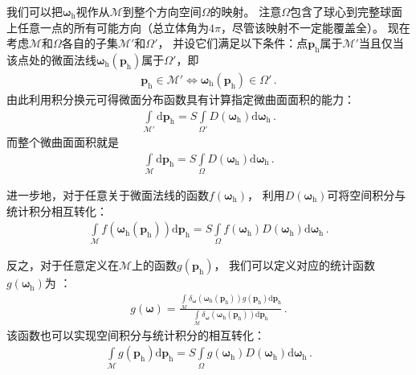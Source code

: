 我们可以把${\bm\omega}_{\mathrm{h}}$视作从$\mathcal{M}$到整个方向空间$\varOmega$的映射。
注意$\varOmega$包含了球心到完整球面上任意一点的所有可能方向（总立体角为$4\pi$，尽管该映射不一定能覆盖全）。
现在考虑$\mathcal{M}$和$\varOmega$各自的子集$\mathcal{M'}$和$\varOmega'$，
并设它们满足以下条件：点${\bm p}_{\mathrm{h}}$属于$\mathcal{M'}$当且仅当
该点处的微面法线${\bm\omega}_{\mathrm{h}}({\bm p}_{\mathrm{h}})$属于$\varOmega'$，即
\begin{align}
    {\bm p}_{\mathrm{h}}\in\mathcal{M'}\Leftrightarrow
    {\bm\omega}_{\mathrm{h}}({\bm p}_{\mathrm{h}})\in\varOmega'\, .
\end{align}
由此利用积分换元可得微面分布函数具有计算指定微曲面面积的能力：
\begin{align}
    \label{eq:08ex01-microsurfaceArea}
    \int\limits_{\mathcal{M}'}\mathrm{d}{\bm p}_{\mathrm{h}}
    =S\int\limits_{\varOmega'}D({\bm\omega}_{\mathrm{h}})\mathrm{d}{\bm\omega}_{\mathrm{h}}\, .
\end{align}
而整个微曲面面积就是
\begin{align}
    \int\limits_{\mathcal{M}}\mathrm{d}{\bm p}_{\mathrm{h}}
    =S\int\limits_{\varOmega}D({\bm\omega}_{\mathrm{h}})\mathrm{d}{\bm\omega}_{\mathrm{h}}\, .
\end{align}

进一步地，对于任意关于微面法线的函数$f({\bm\omega}_{\mathrm{h}})$，
利用$D({\bm\omega}_{\mathrm{h}})$可将空间积分与统计积分相互转化：
\begin{align}
    \int\limits_{\mathcal{M}}f({\bm\omega}_{\mathrm{h}}({\bm p}_{\mathrm{h}}))\mathrm{d}{\bm p}_{\mathrm{h}}
    =S\int\limits_{\varOmega}f({\bm\omega}_{\mathrm{h}})
    D({\bm\omega}_{\mathrm{h}})\mathrm{d}{\bm\omega}_{\mathrm{h}}\, .
\end{align}

反之，对于任意定义在$\mathcal{M}$上的函数$g({\bm p}_{\mathrm{h}})$，
我们可以定义对应的统计函数$g({\bm\omega}_{\mathrm{h}})$为
：
\begin{align}\label{eq:08ex01-StaticFunc}
    g({\bm\omega})=\frac{\displaystyle\int\limits_{\mathcal{M}}
    \delta_{\bm\omega}({\bm\omega}_{\mathrm{h}}({\bm p}_{\mathrm{h}}))
    g({\bm p}_{\mathrm{h}})\mathrm{d}{\bm p}_{\mathrm{h}}}
    {\displaystyle\int\limits_{\mathcal{M}}
    \delta_{\bm\omega}({\bm\omega}_{\mathrm{h}}({\bm p}_{\mathrm{h}}))
    \mathrm{d}{\bm p}_{\mathrm{h}}}\, .
\end{align}
该函数也可以实现空间积分与统计积分的相互转化：
\begin{align}\label{eq:08ex01-TransferSpaceStatic}
    \int\limits_{\mathcal{M}}g({\bm p}_{\mathrm{h}})\mathrm{d}{\bm p}_{\mathrm{h}}
    =S\int\limits_{\varOmega}g({\bm\omega}_{\mathrm{h}})
    D({\bm\omega}_{\mathrm{h}})\mathrm{d}{\bm\omega}_{\mathrm{h}}\, .
\end{align}

